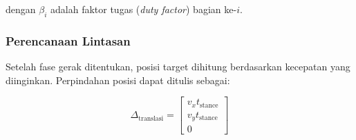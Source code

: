 dengan $\beta_i$ adalah faktor tugas (\emph{duty factor}) bagian ke-$i$.

\subsubsection{Perencanaan Lintasan}

Setelah fase gerak ditentukan, posisi target dihitung berdasarkan kecepatan yang diinginkan. Perpindahan posisi dapat ditulis sebagai:

\begin{equation}
\Delta_{\text{translasi}} = 
\begin{bmatrix}
v_x t_{\text{stance}} \\
v_y t_{\text{stance}} \\
0
\end{bmatrix}
\label{eq:translasi}
\end{equation}

